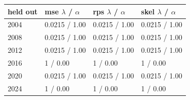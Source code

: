 
\begin{tabular}{llll}
\toprule
held out & mse $\lambda$ / $\alpha$ & rps $\lambda$ / $\alpha$ & skel $\lambda$ / $\alpha$\\
\midrule
2004 & 0.0215 / 1.00 & 0.0215 / 1.00 & 0.0215 / 1.00\\
2008 & 0.0215 / 1.00 & 0.0215 / 1.00 & 0.0215 / 1.00\\
2012 & 0.0215 / 1.00 & 0.0215 / 1.00 & 0.0215 / 1.00\\
2016 & 1 / 0.00 & 1 / 0.00 & 1 / 0.00\\
2020 & 0.0215 / 1.00 & 0.0215 / 1.00 & 0.0215 / 1.00\\
2024 & 1 / 0.00 & 1 / 0.00 & 1 / 0.00\\
\bottomrule
\end{tabular}
